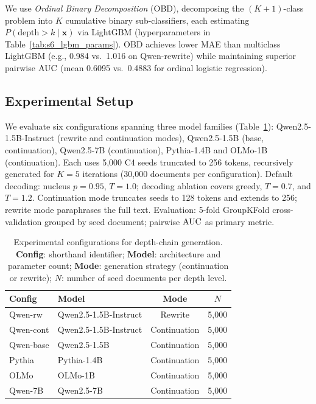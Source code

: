 We use \emph{Ordinal Binary Decomposition} (OBD), decomposing the $(K{+}1)$-class problem into $K$ cumulative binary sub-classifiers, each estimating $P(\text{depth} > k \mid \mathbf{x})$ via LightGBM (hyperparameters in Table~\ref{tab:s6_lgbm_params}).
OBD achieves lower MAE than multiclass LightGBM (e.g., 0.984 vs.\ 1.016 on Qwen-rewrite) while maintaining superior pairwise $\text{AUC}$ (mean 0.6095 vs.\ 0.4883 for ordinal logistic regression).

\subsection{Experimental Setup}
\label{sec:experimental_setup}

We evaluate six configurations spanning three model families (Table~\ref{tab:setup}): Qwen2.5-1.5B-Instruct (rewrite and continuation modes), Qwen2.5-1.5B (base, continuation), Qwen2.5-7B (continuation), Pythia-1.4B and OLMo-1B (continuation).
Each uses 5{,}000 C4 seeds truncated to 256 tokens, recursively generated for $K{=}5$ iterations (30{,}000 documents per configuration).
Default decoding: nucleus $p{=}0.95$, $T{=}1.0$; decoding ablation covers greedy, $T{=}0.7$, and $T{=}1.2$.
Continuation mode truncates seeds to 128 tokens and extends to 256; rewrite mode paraphrases the full text.
Evaluation: 5-fold GroupKFold cross-validation grouped by seed document; pairwise $\text{AUC}$ as primary metric.

\begin{table}[t]
\centering
\small
\caption{Experimental configurations for depth-chain generation. \textbf{Config}: shorthand identifier; \textbf{Model}: architecture and parameter count; \textbf{Mode}: generation strategy (continuation or rewrite); $N$: number of seed documents per depth level.}
\label{tab:setup}
\begin{tabular}{llcc}
\toprule
\textbf{Config} & \textbf{Model} & \textbf{Mode} & $N$ \\
\midrule
Qwen-rw   & Qwen2.5-1.5B-Instruct & Rewrite & 5{,}000 \\
Qwen-cont & Qwen2.5-1.5B-Instruct & Continuation & 5{,}000 \\
Qwen-base & Qwen2.5-1.5B          & Continuation & 5{,}000 \\
Pythia    & Pythia-1.4B            & Continuation & 5{,}000 \\
OLMo      & OLMo-1B               & Continuation & 5{,}000 \\
Qwen-7B   & Qwen2.5-7B            & Continuation & 5{,}000 \\
\bottomrule
\end{tabular}
\end{table}
